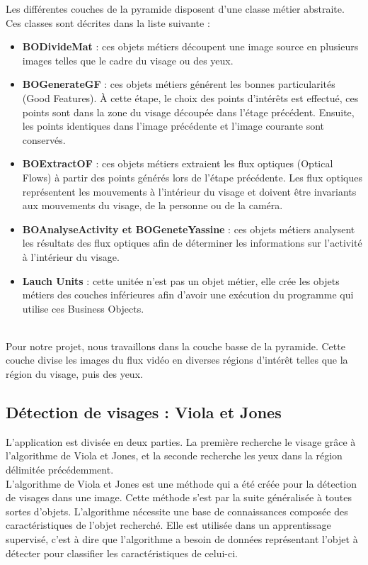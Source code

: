 Les différentes couches de la pyramide disposent d'une classe métier abstraite. Ces classes 
sont décrites dans la liste suivante :\\

\begin{itemize}
 \item \textbf{BODivideMat} : ces objets métiers découpent une image source en plusieurs images telles que 
 le cadre du visage ou des yeux.
 \item \textbf{BOGenerateGF} : ces objets métiers générent les bonnes particularités (Good Features). 
 À cette étape, le choix des points d'intérêts est effectué, ces points sont dans la zone du visage 
 découpée dans l'étage précédent. Ensuite, les points identiques dans l'image précédente et l'image 
 courante sont conservés.
 \item \textbf{BOExtractOF} : ces objets métiers extraient les flux optiques (Optical Flows) à partir 
 des points générés lors de l'étape précédente. Les flux optiques représentent les mouvements à l'intérieur 
 du visage et doivent être invariants aux mouvements du visage, de la personne ou de la caméra.
 \item \textbf{BOAnalyseActivity et BOGeneteYassine} : ces objets métiers analysent les résultats 
 des flux optiques afin de déterminer les informations sur l'activité à l'intérieur du visage.
 \item \textbf{Lauch Units} : cette unitée n'est pas un objet métier, elle crée les objets métiers des 
 couches inférieures afin d'avoir une exécution du programme qui utilise ces Business Objects.
\end{itemize}
\ \\

Pour notre projet, nous travaillons dans la couche basse de la pyramide. Cette couche divise
les images du flux vidéo en diverses régions d'intérêt telles que la région du visage, puis 
des yeux.

\subsection{Détection de visages : Viola et Jones}
L'application est divisée en deux parties. La première recherche le visage grâce à
l'algorithme de Viola et Jones, et la seconde recherche les yeux dans la région délimitée
précédemment.\\

L'algorithme de Viola et Jones\cite{Viola04robustreal-time} est une méthode qui a été créée pour la détection de visages dans une 
image. Cette méthode s'est par la suite généralisée à toutes sortes d'objets. L'algorithme nécessite une 
base de connaissances composée des caractéristiques de l'objet recherché. Elle est utilisée dans un 
apprentissage supervisé, c'est à dire que l'algorithme a besoin de données représentant
l'objet à détecter pour classifier les caractéristiques de celui-ci.\\

